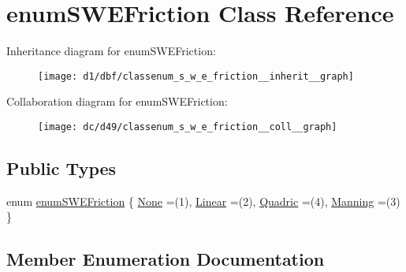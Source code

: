 \hypertarget{classenum_s_w_e_friction}{}\section{enum\+S\+W\+E\+Friction Class Reference}
\label{classenum_s_w_e_friction}


Inheritance diagram for enum\+S\+W\+E\+Friction\+:
\nopagebreak
\begin{figure}[H]
\begin{center}
\leavevmode
\texttt{[image: d1/dbf/classenum\_s\_w\_e\_friction\_\_inherit\_\_graph]}
\end{center}
\end{figure}


Collaboration diagram for enum\+S\+W\+E\+Friction\+:
\nopagebreak
\begin{figure}[H]
\begin{center}
\leavevmode
\texttt{[image: dc/d49/classenum\_s\_w\_e\_friction\_\_coll\_\_graph]}
\end{center}
\end{figure}
\subsection*{Public Types}
\begin{DoxyCompactItemize}
\item 
enum \hyperlink{classenum_s_w_e_friction_a12afe3cac3329886b1ced1056fa9e33d}{enum\+S\+W\+E\+Friction} \{ \hyperlink{classenum_s_w_e_friction_a12afe3cac3329886b1ced1056fa9e33da502975d72ab3a3c15a0376f5f5e122f3}{None} =(1), 
\hyperlink{classenum_s_w_e_friction_a12afe3cac3329886b1ced1056fa9e33da6bd1747954fca18b1a822c0315e2ec90}{Linear} =(2), 
\hyperlink{classenum_s_w_e_friction_a12afe3cac3329886b1ced1056fa9e33da3393728260b12bfa3c1622fd24e12be9}{Quadric} =(4), 
\hyperlink{classenum_s_w_e_friction_a12afe3cac3329886b1ced1056fa9e33da3abd336a5f9323d91c26b17c8b314f85}{Manning} =(3)
 \}
\end{DoxyCompactItemize}


\subsection{Member Enumeration Documentation}
\mbox{\label{classenum_s_w_e_friction_a12afe3cac3329886b1ced1056fa9e33d}} 
